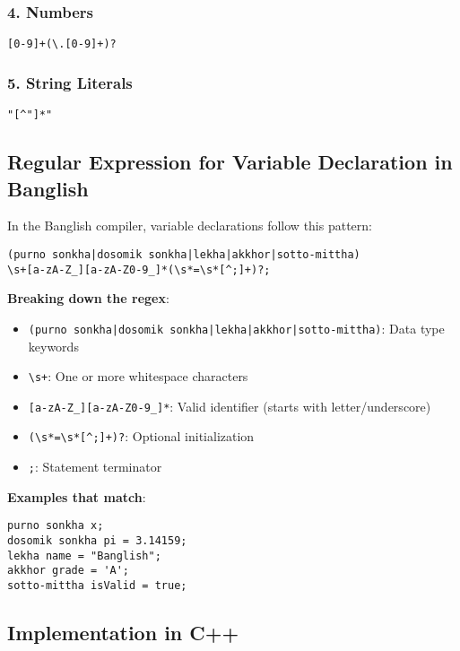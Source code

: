 \documentclass[12pt,a4paper]{article}
\begin{document}
\subsubsection{4. Numbers}
\begin{lstlisting}
[0-9]+(\.[0-9]+)?
\end{lstlisting}

\subsubsection{5. String Literals}
\begin{lstlisting}
"[^"]*"
\end{lstlisting}

\subsection{Regular Expression for Variable Declaration in Banglish}

In the Banglish compiler, variable declarations follow this pattern:

\begin{lstlisting}[caption=Variable Declaration Pattern]
(purno sonkha|dosomik sonkha|lekha|akkhor|sotto-mittha)
\s+[a-zA-Z_][a-zA-Z0-9_]*(\s*=\s*[^;]+)?;
\end{lstlisting}

\textbf{Breaking down the regex}:
\begin{itemize}
    \item \texttt{(purno sonkha|dosomik sonkha|lekha|akkhor|sotto-mittha)}: Data type keywords
    \item \texttt{\textbackslash s+}: One or more whitespace characters
    \item \texttt{[a-zA-Z\_][a-zA-Z0-9\_]*}: Valid identifier (starts with letter/underscore)
    \item \texttt{(\textbackslash s*=\textbackslash s*[\^{};]+)?}: Optional initialization
    \item \texttt{;}: Statement terminator
\end{itemize}

\textbf{Examples that match}:
\begin{lstlisting}
purno sonkha x;
dosomik sonkha pi = 3.14159;
lekha name = "Banglish";
akkhor grade = 'A';
sotto-mittha isValid = true;
\end{lstlisting}

\subsection{Implementation in C++}
\end{document}
